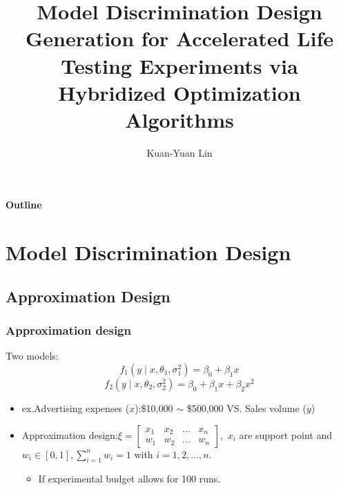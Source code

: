 \documentclass[xcolor=dvipsnames,aspectratio=1610]{beamer}
\title{Model Discrimination Design Generation for Accelerated Life Testing Experiments via Hybridized Optimization Algorithms}
\author{Kuan-Yuan Lin}
\institute[National Taipei University] %
{
  National Taipei University \\ %
  \vspace{0.5cm}
  \textbf{Advisor: Professor [Ping-Yang Chen]}  %
}
\date{}
\begin{document}
\maketitle
\begin{frame}{\textbf{Outline}}
	\tableofcontents %
\end{frame}





\section{Model Discrimination Design}
\subsection{Approximation Design}
\begin{frame}
\frametitle{Approximation design}
Two models:
$$f_1(y\mid x,\theta_1,\sigma_1^2)=\beta_0+\beta_1 x$$
$$f_2(y\mid x,\theta_2,\sigma_2^2)=\beta_0+\beta_1 x+\beta_2 x^2$$

\begin{itemize}
\item ex.Advertising expenses ($x$):\$10,000 $\sim$ \$500,000 VS. Sales volume ($y$)

\item Approximation design:$\xi=\begin{bmatrix}x_1 & x_2 &\dots &x_n \\ w_1 & w_2 &\dots &w_n \end{bmatrix}$,\ $x_i$ are support point and $w_i\in[0,1],\sum_{i=1}^nw_i=1$ with $i=1,2,\dots,n$.
\begin{itemize}
\item If experimental budget allows for 100 runs.
\end{itemize}
\end{itemize}
\end{frame}
\end{document}
